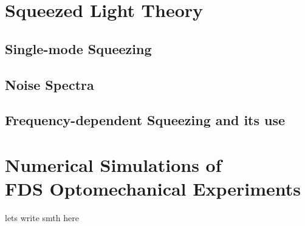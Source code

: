 \section{Squeezed Light Theory}
\subsection{Single-mode Squeezing}
\subsection{Noise Spectra }
\subsection{Frequency-dependent Squeezing and its use}
\hspace{1pt}

\section{\texorpdfstring{Numerical Simulations of \\ FDS Optomechanical Experiments}{Numerical Simulations of FDS Optomechanical Experiments}}

lets write smth here 
